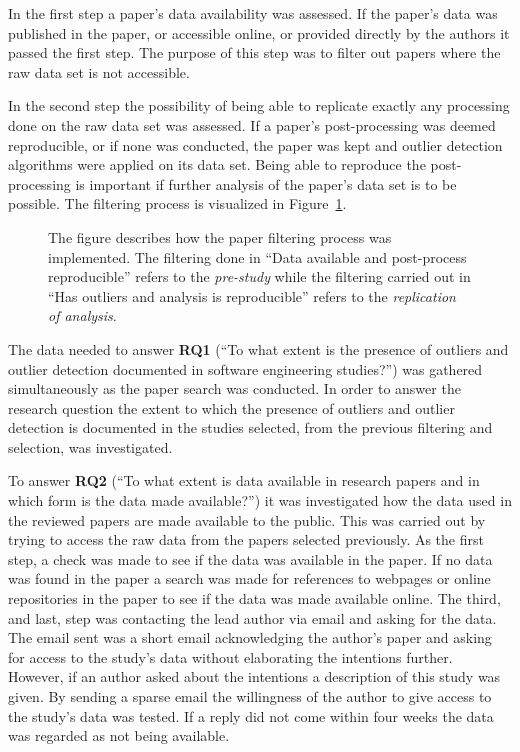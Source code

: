 In the first step a paper's data availability was assessed. If the paper's data was published in the paper, or accessible online, or provided directly by the authors it passed the first step. The purpose of this step was to filter out papers where the raw data set is not accessible. 




In the second step the possibility of being able to replicate exactly any processing done on the raw data set was assessed. If a paper's post-processing was deemed reproducible, or if none was conducted, the paper was kept and outlier detection algorithms were applied on its data set. Being able to reproduce the post-processing is important if further analysis of the paper's data set is to be possible. The filtering process is visualized in Figure~\ref{fig:method-allsteps}.


\begin{figure}
\centering
\caption{The figure describes how the paper filtering process was implemented. The filtering done in ``Data available and post-process reproducible'' refers to the \emph{pre-study} while the filtering carried out in ``Has outliers and analysis is reproducible'' refers to the \emph{replication of analysis}.}
\label{fig:method-allsteps}

\end{figure}




The data needed to answer \textbf{RQ1} (``To what extent is the presence of outliers and outlier detection documented in software engineering studies?'') was gathered simultaneously as the paper search was conducted. In order to answer the research question the extent to which the presence of outliers and outlier detection is documented in the studies selected, from the previous filtering and selection, was investigated.




To answer \textbf{RQ2} (``To what extent is data available in research papers and in which form is the data made available?'') it was investigated how the data used in the reviewed papers are made available to the public. This was carried out by trying to access the raw data from the papers selected previously. As the first step, a check was made to see if the data was available in the paper. If no data was found in the paper a search was made for references to webpages or online repositories in the paper to see if the data was made available online. The third, and last, step was contacting the lead author via email and asking for the data. The email sent was a short email acknowledging the author's paper and asking for access to the study's data without elaborating the intentions further. However, if an author asked about the intentions a description of this study was given. By sending a sparse email the willingness of the author to give access to the study's data was tested. If a reply did not come within four weeks the data was regarded as not being available. 




